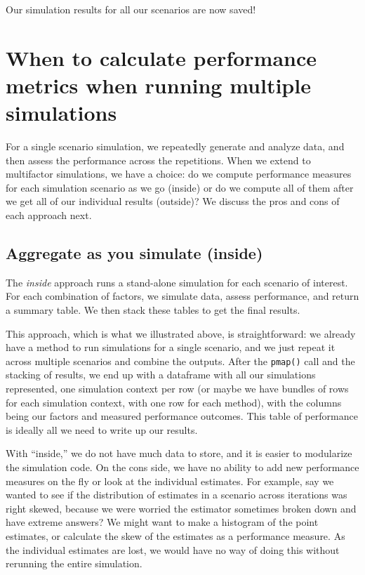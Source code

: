 \documentclass[
]{book}
\begin{document}
Our simulation results for all our scenarios are now saved!

\section{When to calculate performance metrics when running multiple simulations}\label{when-to-calculate-performance-metrics-when-running-multiple-simulations}

For a single scenario simulation, we repeatedly generate and analyze data, and then assess the performance across the repetitions.
When we extend to multifactor simulations, we have a choice: do we compute performance measures for each simulation scenario as we go (inside) or do we compute all of them after we get all of our individual results (outside)?
We discuss the pros and cons of each approach next.

\subsection{Aggregate as you simulate (inside)}\label{aggregate-as-you-simulate-inside}

The \emph{inside} approach runs a stand-alone simulation for each scenario of interest. For each combination of factors, we simulate data, assess performance, and return a summary table. We then stack these tables to get the final results.

This approach, which is what we illustrated above, is straightforward: we already have a method to run simulations for a single scenario, and we just repeat it across multiple scenarios and combine the outputs.
After the \texttt{pmap()} call and the stacking of results, we end up with a dataframe with all our simulations represented, one simulation context per row (or maybe we have bundles of rows for each simulation context, with one row for each method), with the columns being our factors and measured performance outcomes.
This table of performance is ideally all we need to write up our results.

With ``inside,'' we do not have much data to store, and it is easier to modularize the simulation code.
On the cons side, we have no ability to add new performance measures on the fly or look at the individual estimates.
For example, say we wanted to see if the distribution of estimates in a scenario across iterations was right skewed, because we were worried the estimator sometimes broken down and have extreme answers?
We might want to make a histogram of the point estimates, or calculate the skew of the estimates as a performance measure.
As the individual estimates are lost, we would have no way of doing this without rerunning the entire simulation.
\end{document}
